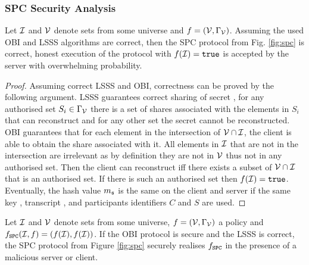 \subsubsection{SPC Security Analysis}
\begin{lemma}[Correctness]\label{lem:correct}
  Let $\mathcal{I}$ and $\mathcal{V}$ denote sets from some universe and $f=(\mathcal{V},\Gamma_\mathcal{V})$.
  Assuming the used \ac{OBI} and \ac{LSSS} algorithms are correct, then the \ac{SPC} protocol from Fig. \ref{fig:spc} is correct, \ie honest execution of the protocol with $f(\mathcal{I}) = \mathtt{true}$ is accepted by the server with overwhelming probability.\end{lemma}
\begin{proof}
Assuming correct \ac{LSSS} and \ac{OBI}, correctness can be proved by the following argument.
LSSS guarantees correct sharing of secret \secret, \ie for any authorised set $S_i\in \Gamma_\mathcal{V}$ there is a set of shares associated with the elements in $S_i$ that can reconstruct \secret and for any other set the secret cannot be reconstructed. 
OBI guarantees that for each element in the intersection of $\mathcal{V}\cap \mathcal{I}$, the client is able to obtain the share associated with it. 
All elements in $\mathcal{I}$ that are not in the intersection are irrelevant as by definition they are not in $\mathcal{V}$ thus not in any authorised set. 
Then the client can reconstruct \secret iff there exists a subset of $\mathcal{V}\cap \mathcal{I}$ that is an authorised set. 
If there is such an authorised set then $f(\mathcal{I})=\mathtt{true}$. Eventually, the hash value $m_\mathfrak{s}$ is the same on the client and server if the same key \secret, transcript \trans, and participants identifiers $C$ and $S$ are used.
\end{proof}

\begin{lemma}[Privacy]\label{lem:SPCprivacy}
 Let $\mathcal{I}$ and $\mathcal{V}$ denote sets from some universe, $f=(\mathcal{V},\Gamma_\mathcal{V})$ a policy and $f_\mathtt{SPC}(\mathcal{I}, f)=(f(\mathcal{I}), f(\mathcal{I}))$. 
 If the \ac{OBI} protocol is secure and the \ac{LSSS} is correct, the \ac{SPC} protocol from Figure \ref{fig:spc} securely realises $f_\mathtt{SPC}$ in the presence of a malicious server or client.
\end{lemma}

